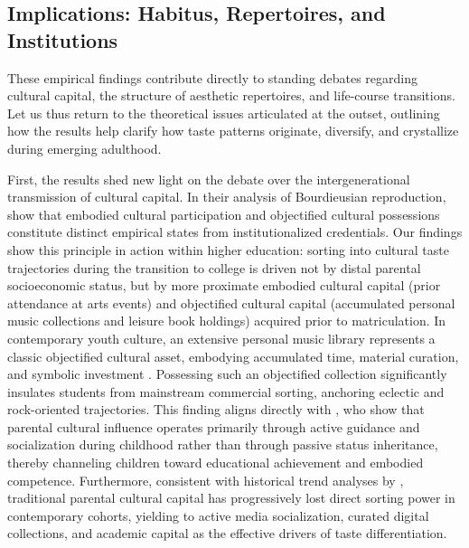 \documentclass[12pt]{article}
\begin{document}
\subsection{Implications: Habitus, Repertoires, and Institutions}

These empirical findings contribute directly to standing debates regarding cultural capital, the structure of aesthetic repertoires, and life-course transitions. Let us thus return to the theoretical issues articulated at the outset, outlining how the results help clarify how taste patterns originate, diversify, and crystallize during emerging adulthood.

First, the results shed new light on the debate over the intergenerational transmission of cultural capital. In their analysis of Bourdieusian reproduction, \citet{kraaykamp2010intergenerational} show that embodied cultural participation and objectified cultural possessions constitute distinct empirical states from institutionalized credentials. Our findings show this principle in action within higher education: sorting into cultural taste trajectories during the transition to college is driven not by distal parental socioeconomic status, but by more proximate embodied cultural capital (prior attendance at arts events) and objectified cultural capital (accumulated personal music collections and leisure book holdings) acquired prior to matriculation. In contemporary youth culture, an extensive personal music library represents a classic objectified cultural asset, embodying accumulated time, material curation, and symbolic investment \citep{hennion2010loving-89e}. Possessing such an objectified collection significantly insulates students from mainstream commercial sorting, anchoring eclectic and rock-oriented trajectories. This finding aligns directly with \citet{vanhek2015how}, who show that parental cultural influence operates primarily through active guidance and socialization during childhood rather than through passive status inheritance, thereby channeling children toward educational achievement and embodied competence. Furthermore, consistent with historical trend analyses by \citet{kraaykamp2016parental}, traditional parental cultural capital has progressively lost direct sorting power in contemporary cohorts, yielding to active media socialization, curated digital collections, and academic capital as the effective drivers of taste differentiation.
\end{document}
